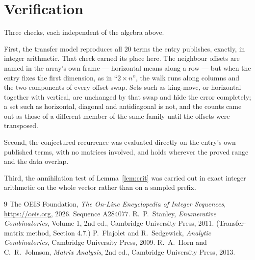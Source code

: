 \documentclass[11pt,a4paper]{article}
\theoremstyle{plain}
\theoremstyle{definition}
\begin{document}
\section{Verification}

Three checks, each independent of the algebra above.

First, the transfer model reproduces all $20$ terms the entry publishes, exactly, in
integer arithmetic. That check earned its place here. The neighbour offsets are named in the
array's own frame --- horizontal means along a row --- but when the entry fixes the first
dimension, as in ``$2\times n$'', the walk runs along columns and the two components of every
offset swap. Sets such as king-move, or horizontal together with vertical, are unchanged by
that swap and hide the error completely; a set such as horizontal, diagonal and antidiagonal
is not, and the counts came out as those of a different member of the same family until the
offsets were transposed.

Second, the conjectured recurrence was evaluated directly on the entry's own published terms,
with no matrices involved, and holds wherever the proved range and the data overlap.

Third, the annihilation test of Lemma~\ref{lem:crit} was carried out in exact integer
arithmetic on the whole vector rather than on a sampled prefix.

\begin{thebibliography}{9}
 The OEIS Foundation, \emph{The On-Line Encyclopedia of Integer
Sequences}, \url{https://oeis.org}, 2026. Sequence A284077.
 R.~P.~Stanley, \emph{Enumerative Combinatorics}, Volume 1, 2nd ed.,
Cambridge University Press, 2011. (Transfer-matrix method, Section 4.7.)
 P.~Flajolet and R.~Sedgewick, \emph{Analytic Combinatorics}, Cambridge
University Press, 2009.
 R.~A.~Horn and C.~R.~Johnson, \emph{Matrix Analysis}, 2nd ed., Cambridge
University Press, 2013.
\end{thebibliography}
\end{document}
